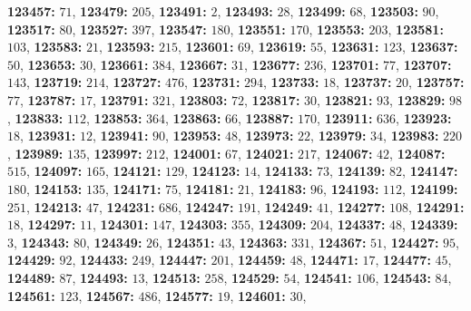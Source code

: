 \textsf{\bfseries 123457:} $71$, \textsf{\bfseries 123479:} $205$, \textsf{\bfseries 123491:} $2$, \textsf{\bfseries 123493:} $28$, \textsf{\bfseries 123499:} $68$, \textsf{\bfseries 123503:} $90$, \textsf{\bfseries 123517:} $80$, \textsf{\bfseries 123527:} $397$, \textsf{\bfseries 123547:} $180$, \textsf{\bfseries 123551:} $170$, \textsf{\bfseries 123553:} $203$, \textsf{\bfseries 123581:} $103$, \textsf{\bfseries 123583:} $21$, \textsf{\bfseries 123593:} $215$, \textsf{\bfseries 123601:} $69$, \textsf{\bfseries 123619:} $55$, \textsf{\bfseries 123631:} $123$, \textsf{\bfseries 123637:} $50$, \textsf{\bfseries 123653:} $30$, \textsf{\bfseries 123661:} $384$, \textsf{\bfseries 123667:} $31$, \textsf{\bfseries 123677:} $236$, \textsf{\bfseries 123701:} $77$, \textsf{\bfseries 123707:} $143$, \textsf{\bfseries 123719:} $214$, \textsf{\bfseries 123727:} $476$, \textsf{\bfseries 123731:} $294$, \textsf{\bfseries 123733:} $18$, \textsf{\bfseries 123737:} $20$, \textsf{\bfseries 123757:} $77$, \textsf{\bfseries 123787:} $17$, \textsf{\bfseries 123791:} $321$, \textsf{\bfseries 123803:} $72$, \textsf{\bfseries 123817:} $30$, \textsf{\bfseries 123821:} $93$, \textsf{\bfseries 123829:} $98$, \textsf{\bfseries 123833:} $112$, \textsf{\bfseries 123853:} $364$, \textsf{\bfseries 123863:} $66$, \textsf{\bfseries 123887:} $170$, \textsf{\bfseries 123911:} $636$, \textsf{\bfseries 123923:} $18$, \textsf{\bfseries 123931:} $12$, \textsf{\bfseries 123941:} $90$, \textsf{\bfseries 123953:} $48$, \textsf{\bfseries 123973:} $22$, \textsf{\bfseries 123979:} $34$, \textsf{\bfseries 123983:} $220$, \textsf{\bfseries 123989:} $135$, \textsf{\bfseries 123997:} $212$, \textsf{\bfseries 124001:} $67$, \textsf{\bfseries 124021:} $217$, \textsf{\bfseries 124067:} $42$, \textsf{\bfseries 124087:} $515$, \textsf{\bfseries 124097:} $165$, \textsf{\bfseries 124121:} $129$, \textsf{\bfseries 124123:} $14$, \textsf{\bfseries 124133:} $73$, \textsf{\bfseries 124139:} $82$, \textsf{\bfseries 124147:} $180$, \textsf{\bfseries 124153:} $135$, \textsf{\bfseries 124171:} $75$, \textsf{\bfseries 124181:} $21$, \textsf{\bfseries 124183:} $96$, \textsf{\bfseries 124193:} $112$, \textsf{\bfseries 124199:} $251$, \textsf{\bfseries 124213:} $47$, \textsf{\bfseries 124231:} $686$, \textsf{\bfseries 124247:} $191$, \textsf{\bfseries 124249:} $41$, \textsf{\bfseries 124277:} $108$, \textsf{\bfseries 124291:} $18$, \textsf{\bfseries 124297:} $11$, \textsf{\bfseries 124301:} $147$, \textsf{\bfseries 124303:} $355$, \textsf{\bfseries 124309:} $204$, \textsf{\bfseries 124337:} $48$, \textsf{\bfseries 124339:} $3$, \textsf{\bfseries 124343:} $80$, \textsf{\bfseries 124349:} $26$, \textsf{\bfseries 124351:} $43$, \textsf{\bfseries 124363:} $331$, \textsf{\bfseries 124367:} $51$, \textsf{\bfseries 124427:} $95$, \textsf{\bfseries 124429:} $92$, \textsf{\bfseries 124433:} $249$, \textsf{\bfseries 124447:} $201$, \textsf{\bfseries 124459:} $48$, \textsf{\bfseries 124471:} $17$, \textsf{\bfseries 124477:} $45$, \textsf{\bfseries 124489:} $87$, \textsf{\bfseries 124493:} $13$, \textsf{\bfseries 124513:} $258$, \textsf{\bfseries 124529:} $54$, \textsf{\bfseries 124541:} $106$, \textsf{\bfseries 124543:} $84$, \textsf{\bfseries 124561:} $123$, \textsf{\bfseries 124567:} $486$, \textsf{\bfseries 124577:} $19$, \textsf{\bfseries 124601:} $30$, 

